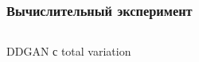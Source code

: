 \documentclass[8pt]{beamer}
\begin{document}
\begin{frame}
	\frametitle{Вычислительный эксперимент}
	\begin{columns}
		\begin{column}{0.8\textwidth}
			\begin{block}{DDGAN с total variation}
				\begin{figure}[H]
				\end{figure}
			\end{block}
		\end{column}
		\begin{column}{0.23\textwidth}
			\begin{figure}[H]
				

\end{figure}
\end{column}
\end{columns}
\end{frame}
\end{document}
